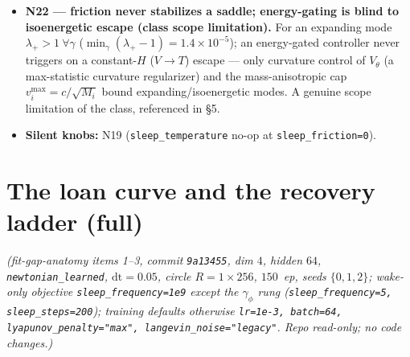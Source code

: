 \documentclass[10pt]{article}
\begin{document}
\begin{itemize}
\item \textbf{N22 --- friction never stabilizes a saddle; energy-gating is blind to isoenergetic escape (class scope limitation).} For an expanding mode $\lambda_+>1\ \forall\gamma$ ($\min_\gamma(\lambda_+-1)=1.4{\times}10^{-5}$); an energy-gated controller never triggers on a constant-$H$ ($V\to T$) escape --- only curvature control of $V_\theta$ (a max-statistic curvature regularizer) and the mass-anisotropic cap $v_i^{\max}=c/\sqrt{M_i}$ bound expanding/isoenergetic modes. A genuine scope limitation of the class, referenced in \S5.
\item \textbf{Silent knobs:} N19 (\texttt{sleep\_temperature} no-op at \texttt{sleep\_friction=0}).
\end{itemize}

\section{The loan curve and the recovery ladder (full)}\label{app:loan}
\emph{(fit-gap-anatomy items 1--3, commit \texttt{9a13455}, dim $4$, hidden $64$, \texttt{newtonian\_learned}, $\mathrm{dt}=0.05$, circle $R{=}1{\times}256$, $150$~ep, seeds $\{0,1,2\}$; wake-only objective \texttt{sleep\_frequency=1e9} except the $\gamma_\phi$ rung (\texttt{sleep\_frequency=5, sleep\_steps=200}); training defaults otherwise \texttt{lr=1e-3, batch=64, lyapunov\_penalty="max", langevin\_noise="legacy"}. Repo read-only; no code changes.)}
\end{document}
